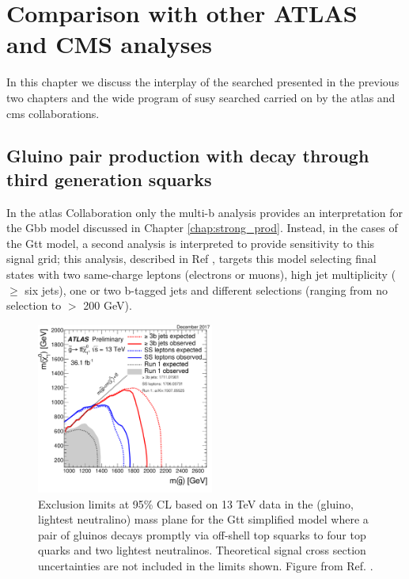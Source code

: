 \chapter{Comparison with other ATLAS and CMS analyses}
\label{chap:summary_susy}

In this chapter we discuss the interplay of the searched presented in the previous two chapters and the 
wide program of \gls{susy} searched carried on by the \gls{atlas} and \gls{cms} collaborations. 

\section{Gluino pair production with decay through third generation squarks}

In the \gls{atlas} Collaboration only the multi-b analysis provides an interpretation for the Gbb model 
discussed in Chapter \ref{chap:strong_prod}.
Instead, in the cases of the Gtt model, a second analysis is interpreted to provide sensitivity  to this 
signal grid; this analysis, described in Ref \cite{Aaboud:2017dmy}, targets this model selecting final states with two same-charge 
leptons (electrons or muons), high jet multiplicity ($\geq$ six jets), one or two b-tagged jets and different \met selections 
(ranging from no \met selection to \met $>$ 200 GeV).

\begin{figure}[htbp]
	\centering
	\includegraphics[width=0.52\textwidth]{figures/summary_plots/ATLAS_SUSY_Gtt.pdf}
	\caption{Exclusion limits at 95\% CL based on 13 TeV data in the (gluino, lightest neutralino) 
	mass plane for the Gtt simplified model where a pair of gluinos decays promptly via off-shell top 
	squarks to four top quarks and two lightest neutralinos. Theoretical signal cross section uncertainties are 
	not included in the limits shown. Figure from Ref. \cite{atlasSUSYSummary}.
	} 
	\label{fig:summary_atlas_Gtt}
\end{figure}

